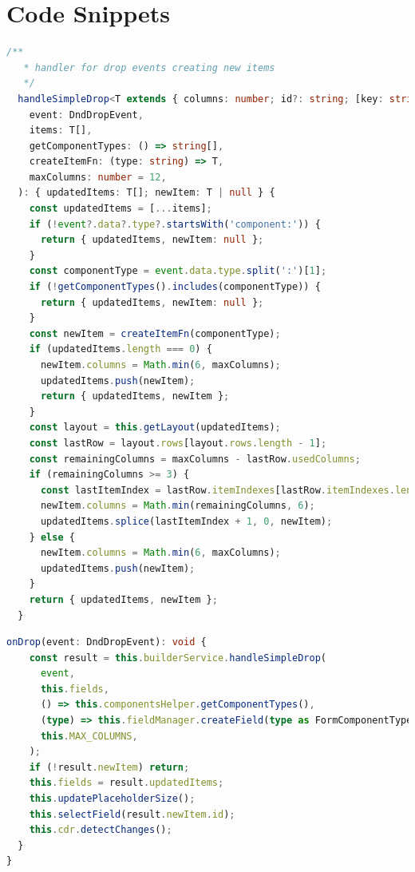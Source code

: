 \documentclass[a4paper,11pt]{article}
\begin{document}
\section{Code Snippets}
\renewcommand{\lstlistingname}{\texttt{Drop Function in Builder Service}}
\begin{lstlisting}[language=TypeScript, caption={\texttt{handleSimpleDrop} function}]
  /**
   * handler for drop events creating new items
   */
  handleSimpleDrop<T extends { columns: number; id?: string; [key: string]: any }>(
    event: DndDropEvent,
    items: T[],
    getComponentTypes: () => string[],
    createItemFn: (type: string) => T,
    maxColumns: number = 12,
  ): { updatedItems: T[]; newItem: T | null } {
    const updatedItems = [...items];
    if (!event?.data?.type?.startsWith('component:')) {
      return { updatedItems, newItem: null };
    }
    const componentType = event.data.type.split(':')[1];
    if (!getComponentTypes().includes(componentType)) {
      return { updatedItems, newItem: null };
    }
    const newItem = createItemFn(componentType);
    if (updatedItems.length === 0) {
      newItem.columns = Math.min(6, maxColumns);
      updatedItems.push(newItem);
      return { updatedItems, newItem };
    }
    const layout = this.getLayout(updatedItems);
    const lastRow = layout.rows[layout.rows.length - 1];
    const remainingColumns = maxColumns - lastRow.usedColumns;
    if (remainingColumns >= 3) {
      const lastItemIndex = lastRow.itemIndexes[lastRow.itemIndexes.length - 1];
      newItem.columns = Math.min(remainingColumns, 6);
      updatedItems.splice(lastItemIndex + 1, 0, newItem);
    } else {
      newItem.columns = Math.min(6, maxColumns);
      updatedItems.push(newItem);
    }
    return { updatedItems, newItem };
  }
\end{lstlisting}
\renewcommand{\lstlistingname}{\texttt{Aufruf von handleSimpleDrop in Canvas Kompopnente }}
\begin{lstlisting}[language=TypeScript, caption={\texttt{handleSimpleDrop} function}]
  onDrop(event: DndDropEvent): void {
    const result = this.builderService.handleSimpleDrop(
      event,
      this.fields,
      () => this.componentsHelper.getComponentTypes(),
      (type) => this.fieldManager.createField(type as FormComponentType),
      this.MAX_COLUMNS,
    );
    if (!result.newItem) return;
    this.fields = result.updatedItems;
    this.updatePlaceholderSize();
    this.selectField(result.newItem.id);
    this.cdr.detectChanges();
  }
}
\end{lstlisting}
\end{document}
